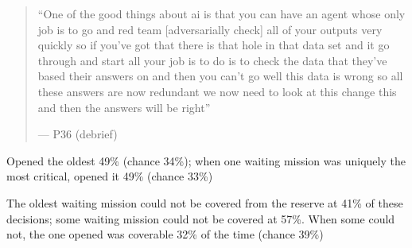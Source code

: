 \begin{quote}\small
``One of the good things about ai is that you can have an agent whose only job is to go and red team [adversarially check] all of your outputs very quickly so if you've got that there is that hole in that data set and it go through and start all your job is to do is to check the data that they've based their answers on and then you can't go well this data is wrong so all these answers are now redundant we now need to look at this change this and then the answers will be right''\par\hfill--- P36 (debrief)
\end{quote}


Opened the oldest 49\% (chance 34\%); when one waiting mission was uniquely the most critical, opened it 49\% (chance 33\%)

The oldest waiting mission could not be covered from the reserve at 41\% of these decisions; some waiting mission could not be covered at 57\%. When some could not, the one opened was coverable 32\% of the time (chance 39\%)


\clearpage


